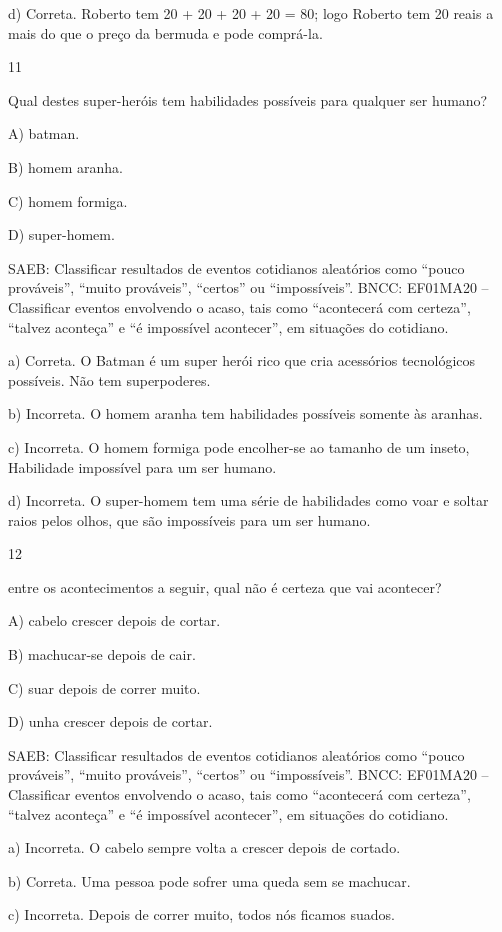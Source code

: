 \begin{itemize}
\begin{itemize}
d) Correta. Roberto tem 20 + 20 + 20 + 20 = 80; logo Roberto tem 20
reais a mais do que o preço da bermuda e pode comprá-la.

\num{11}

Qual destes super-heróis tem habilidades possíveis para qualquer ser humano?

A) batman.

B) homem aranha.

C) homem formiga.

D) super-homem.

SAEB: Classificar resultados de eventos cotidianos aleatórios como
``pouco prováveis'', ``muito prováveis'', ``certos'' ou ``impossíveis''.
BNCC: EF01MA20 -- Classificar eventos envolvendo o acaso, tais como
``acontecerá com certeza'', ``talvez aconteça'' e ``é impossível
acontecer'', em situações do cotidiano.

a) Correta. O Batman é um super herói rico que cria acessórios
tecnológicos possíveis. Não tem superpoderes.

b) Incorreta. O homem aranha tem habilidades possíveis somente às
aranhas.

c) Incorreta. O homem formiga pode encolher-se ao tamanho de um inseto,
Habilidade impossível para um ser humano.

d) Incorreta. O super-homem tem uma série de habilidades como voar e
soltar raios pelos olhos, que são impossíveis para um ser humano.

\num{12}

entre os acontecimentos a seguir, qual não é certeza que vai
acontecer?

A) cabelo crescer depois de cortar.

B) machucar-se depois de cair.

C) suar depois de correr muito.

D) unha crescer depois de cortar.

SAEB: Classificar resultados de eventos cotidianos aleatórios como
``pouco prováveis'', ``muito prováveis'', ``certos'' ou ``impossíveis''.
BNCC: EF01MA20 -- Classificar eventos envolvendo o acaso, tais como
``acontecerá com certeza'', ``talvez aconteça'' e ``é impossível
acontecer'', em situações do cotidiano.

a) Incorreta. O cabelo sempre volta a crescer depois de cortado.

b) Correta. Uma pessoa pode sofrer uma queda sem se machucar.

c) Incorreta. Depois de correr muito, todos nós ficamos suados.


\end{itemize}
\end{itemize}
